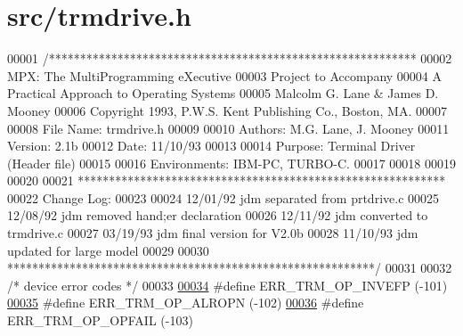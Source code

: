 \hypertarget{trmdrive_8h_source}{
\section{src/trmdrive.h}
}

\begin{DoxyCode}
00001 \textcolor{comment}{/***********************************************************}
00002 \textcolor{comment}{        MPX: The MultiProgramming eXecutive}
00003 \textcolor{comment}{        Project to Accompany}
00004 \textcolor{comment}{        A Practical Approach to Operating Systems}
00005 \textcolor{comment}{        Malcolm G. Lane & James D. Mooney}
00006 \textcolor{comment}{        Copyright 1993, P.W.S. Kent Publishing Co., Boston, MA.}
00007 \textcolor{comment}{        }
00008 \textcolor{comment}{        File Name: trmdrive.h}
00009 \textcolor{comment}{}
00010 \textcolor{comment}{        Authors: M.G. Lane, J. Mooney}
00011 \textcolor{comment}{        Version: 2.1b}
00012 \textcolor{comment}{        Date: 11/10/93}
00013 \textcolor{comment}{}
00014 \textcolor{comment}{        Purpose: Terminal Driver (Header file)}
00015 \textcolor{comment}{}
00016 \textcolor{comment}{        Environments: IBM-PC, TURBO-C.}
00017 \textcolor{comment}{                }
00018 \textcolor{comment}{}
00019 \textcolor{comment}{}
00020 \textcolor{comment}{}
00021 \textcolor{comment}{***********************************************************}
00022 \textcolor{comment}{  Change Log:}
00023 \textcolor{comment}{}
00024 \textcolor{comment}{        12/01/92  jdm   separated from prtdrive.c}
00025 \textcolor{comment}{        12/08/92  jdm   removed hand;er declaration}
00026 \textcolor{comment}{        12/11/92  jdm   converted to trmdrive.c}
00027 \textcolor{comment}{        03/19/93  jdm   final version for V2.0b}
00028 \textcolor{comment}{        11/10/93  jdm   updated for large model}
00029 \textcolor{comment}{}
00030 \textcolor{comment}{***********************************************************/}
00031 
00032 \textcolor{comment}{/* device error codes */}
00033 
\hypertarget{trmdrive_8h_source_l00034}{}\hyperlink{trmdrive_8h_a4cf9f35af3ffda71ffb9eef6f3ac9d52}{00034} \textcolor{preprocessor}{#define ERR\_TRM\_OP\_INVEFP       (-101)}
\hypertarget{trmdrive_8h_source_l00035}{}\hyperlink{trmdrive_8h_aa972fb46ff1456a5b14a87df4d951f9c}{00035} \textcolor{preprocessor}{}\textcolor{preprocessor}{#define ERR\_TRM\_OP\_ALROPN       (-102)}
\hypertarget{trmdrive_8h_source_l00036}{}\hyperlink{trmdrive_8h_aa690cb6d0876fcaacd02349985603865}{00036} \textcolor{preprocessor}{}\textcolor{preprocessor}{#define ERR\_TRM\_OP\_OPFAIL       (-103)}

\end{DoxyCode}

